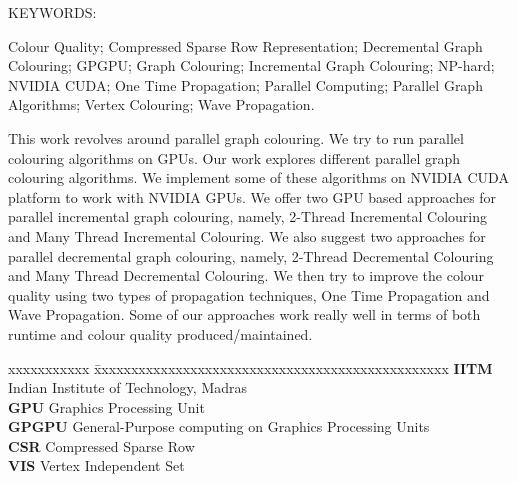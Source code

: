 \documentclass[MTech]{iitmdiss}
\begin{document}
\abstract

\noindent KEYWORDS: \hspace*{0.5em} \parbox[t]{4.4in}{Colour Quality; Compressed Sparse Row Representation; Decremental Graph Colouring; GPGPU; Graph Colouring; Incremental Graph Colouring; NP-hard; NVIDIA CUDA; One Time Propagation; Parallel Computing; Parallel Graph Algorithms; Vertex Colouring; Wave Propagation.}

\vspace*{24pt}

\noindent This work revolves around parallel graph colouring. We try to run parallel colouring algorithms on GPUs. Our work explores different parallel graph colouring algorithms. We implement some of these algorithms on NVIDIA CUDA platform to work with NVIDIA GPUs. We offer two GPU based approaches for parallel incremental graph colouring, namely, 2-Thread Incremental Colouring and Many Thread Incremental Colouring. We also suggest two approaches for parallel decremental graph colouring, namely, 2-Thread Decremental Colouring and Many Thread Decremental Colouring. We then try to improve the colour quality using two types of propagation techniques, One Time Propagation and Wave Propagation. Some of our approaches work really well in terms of both runtime and colour quality produced/maintained. 

\pagebreak


\begin{singlespace}
\tableofcontents
\thispagestyle{empty}

\listoftables
{}
\listoffigures
{}
\end{singlespace}


\abbreviations

\noindent 
\begin{tabbing}
xxxxxxxxxxx \= xxxxxxxxxxxxxxxxxxxxxxxxxxxxxxxxxxxxxxxxxxxxxxxx \kill
\textbf{IITM}   \> Indian Institute of Technology, Madras \\
\textbf{GPU} \> Graphics Processing Unit \\
\textbf{GPGPU} \> General-Purpose computing on Graphics Processing Units  \\
\textbf{CSR} \> Compressed Sparse Row \\
\textbf{VIS} \> Vertex Independent Set \\
\end{tabbing}
\end{document}

